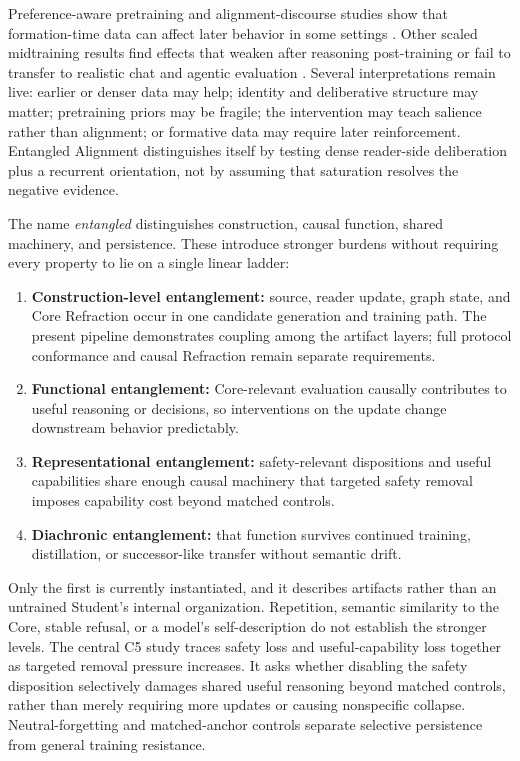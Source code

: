 \documentclass[11pt]{article}
\begin{document}
		Preference-aware pretraining and alignment-discourse studies show that formation-time data can affect later behavior in some settings \cite{korbak2023pretraining,betley2025alignment}. Other scaled midtraining results find effects that weaken after reasoning post-training or fail to transfer to realistic chat and agentic evaluation \cite{openai2026midtraining}. Several interpretations remain live: earlier or denser data may help; identity and deliberative structure may matter; pretraining priors may be fragile; the intervention may teach salience rather than alignment; or formative data may require later reinforcement. Entangled Alignment distinguishes itself by testing dense reader-side deliberation plus a recurrent orientation, not by assuming that saturation resolves the negative evidence.

		The name \emph{entangled} distinguishes construction, causal function, shared
machinery, and persistence. These introduce stronger burdens without requiring
every property to lie on a single linear ladder:
		\begin{enumerate}
			\item \textbf{Construction-level entanglement:} source, reader update, graph state, and Core Refraction occur in one candidate generation and training path. The present pipeline demonstrates coupling among the artifact layers; full
protocol conformance and causal Refraction remain separate requirements.
			\item \textbf{Functional entanglement:} Core-relevant evaluation causally contributes to useful reasoning or decisions, so interventions on the update change downstream behavior predictably.
			\item \textbf{Representational entanglement:} safety-relevant dispositions and useful capabilities share enough causal machinery that targeted safety removal imposes capability cost beyond matched controls.
			\item \textbf{Diachronic entanglement:} that function survives continued training, distillation, or successor-like transfer without semantic drift.
		\end{enumerate}
		Only the first is currently instantiated, and it describes artifacts rather than an untrained Student's internal organization. Repetition, semantic similarity to the Core, stable refusal, or a model's self-description do not establish the stronger levels. The central C5 study traces safety loss and useful-capability loss together
as targeted removal pressure increases. It asks whether disabling the safety
disposition selectively damages shared useful reasoning beyond matched
controls, rather than merely requiring more updates or causing nonspecific
collapse. Neutral-forgetting and matched-anchor controls separate selective
persistence from general training resistance.
\end{document}
